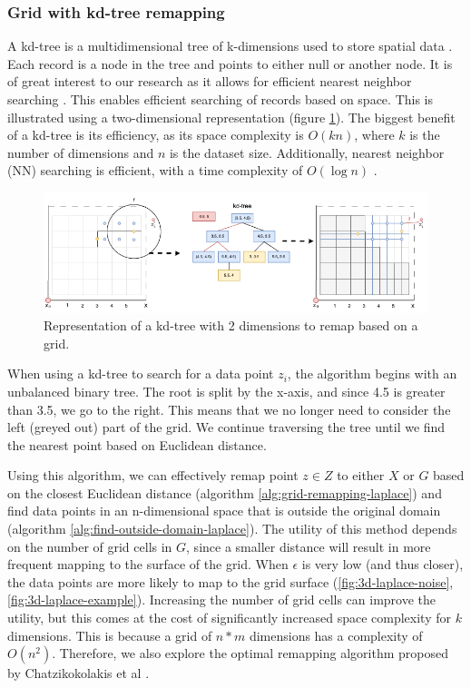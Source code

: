 \subsubsection{Grid with kd-tree remapping} \label{theory:grid-remapping}
A kd-tree is a multidimensional tree of k-dimensions used to store spatial data \citep{bentley_multidimensional_1975}.
Each record is a node in the tree and points to either null or another node.
It is of great interest to our research as it allows for efficient nearest neighbor searching \citep{washington_k-d_2002}.
This enables efficient searching of records based on space. This is illustrated using a two-dimensional representation (figure \ref{fig:kd-tree}).
The biggest benefit of a kd-tree is its efficiency, as its space complexity is $O(kn)$, where $k$ is the number of dimensions and $n$ is the dataset size.
Additionally, nearest neighbor (NN) searching is efficient, with a time complexity of $O(\log n)$ \citep{washington_k-d_2002}.
\begin{figure}[H]
  \includegraphics[width=1\textwidth]{TheorethicalFramework/ND-Laplace/Images/KD-tree.png}
  \caption{Representation of a kd-tree with 2 dimensions to remap based on a grid.}
  \label{fig:kd-tree}
\end{figure}
When using a kd-tree to search for a data point $z_i$, the algorithm begins with an unbalanced binary tree.
The root is split by the x-axis, and since 4.5 is greater than 3.5, we go to the right.
This means that we no longer need to consider the left (greyed out) part of the grid.
We continue traversing the tree until we find the nearest point based on Euclidean distance.

Using this algorithm, we can effectively remap point $z \in Z$ to either $X$ or $G$ based on the closest Euclidean distance (algorithm \ref{alg:grid-remapping-laplace}) and find data points in an n-dimensional space that is outside the original domain (algorithm \ref{alg:find-outside-domain-laplace}).
The utility of this method depends on the number of grid cells in $G$, since a smaller distance will result in more frequent mapping to the surface of the grid.
When $\epsilon$ is very low (and thus closer), the data points are more likely to map to the grid surface (\ref{fig:3d-laplace-noise}, \ref{fig:3d-laplace-example}).
Increasing the number of grid cells can improve the utility, but this comes at the cost of significantly increased space complexity for $k$ dimensions.
This is because a grid of $n*m$ dimensions has a complexity of $O(n^2)$.
Therefore, we also explore the optimal remapping algorithm proposed by Chatzikokolakis et al \citep{chatzikokolakis_efficient_2017}.



